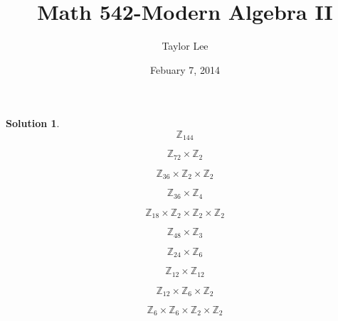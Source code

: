 \documentclass[12pt]{article}
\theoremstyle{moo}
\newtheorem*{sol}{Solution}
\def\zz{{\mathbb Z}}
\begin{document}
\fontseries {\seriesdefault}
\fontshape {\shapedefault}
\selectfont

\title{ Math 542-Modern Algebra II}
\date{Febuary 7, 2014}         %
\author{Taylor Lee}      %
\maketitle                      %



\begin{sol}
\[
\zz_{144}
\]

\[
\zz_{72} \times \zz_{2}
\]

\[
\zz_{36} \times \zz_{2} \times \zz_{2}
\]


\[
\zz_{36} \times \zz_{4}
\]

\[
\zz_{18} \times \zz_{2} \times \zz_{2} \times \zz_{2}
\]


\[
\zz_{48} \times \zz_{3}
\]

\[
\zz_{24} \times \zz_{6}
\]

\[
\zz_{12} \times \zz_{12}
\]

\[
\zz_{12} \times \zz_{6} \times \zz_{2}
\]

\[
\zz_{6} \times \zz_{6} \times \zz_{2} \times \zz_{2}
\]



\end{sol}
\end{document}
